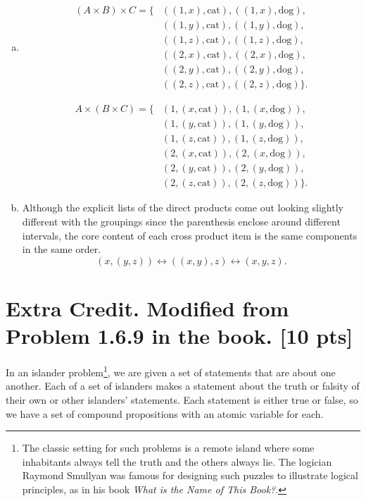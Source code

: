 \documentclass[12pt]{article}
\begin{document}
	\begin{enumerate}[(a)]
		\item
			\[
				\begin{aligned}
					(A \times B) \times C = \{ & ((1,x),\text{cat}), ((1,x),\text{dog}),    \\
					                           & ((1,y),\text{cat}), ((1,y),\text{dog}),    \\
					                           & ((1,z),\text{cat}), ((1,z),\text{dog}),    \\
					                           & ((2,x),\text{cat}), ((2,x),\text{dog}),    \\
					                           & ((2,y),\text{cat}), ((2,y),\text{dog}),    \\
					                           & ((2,z),\text{cat}), ((2,z),\text{dog}) \}.
				\end{aligned}
			\]

			\[
				\begin{aligned}
					A \times (B \times C) = \{ & (1,(x,\text{cat})), (1,(x,\text{dog})),    \\
					                           & (1,(y,\text{cat})), (1,(y,\text{dog})),    \\
					                           & (1,(z,\text{cat})), (1,(z,\text{dog})),    \\
					                           & (2,(x,\text{cat})), (2,(x,\text{dog})),    \\
					                           & (2,(y,\text{cat})), (2,(y,\text{dog})),    \\
					                           & (2,(z,\text{cat})), (2,(z,\text{dog})) \}.
				\end{aligned}
			\]

		\item Although the explicit lists of the direct products come out looking slightly
			different with the groupings since the parenthesis enclose around different
			intervals, the core content of each cross product item is the same
			components in the same order.
			\[
				(x,(y,z)) \leftrightarrow ((x,y),z) \leftrightarrow (x,y,z).
			\]
	\end{enumerate}

	\newpage

	\section*{\textbf{Extra Credit. Modified from Problem 1.6.9 in the book.} [10
	pts]}
	In an islander problem\footnote{The classic setting for such problems is a
	remote island where some inhabitants always tell the truth and the others
	always lie. The logician Raymond Smullyan was famous for designing such puzzles
	to illustrate logical principles, as in his book
	{\em What is the Name of This Book?}.}, we are given a set of statements that are
	about one another. Each of a set of islanders makes a statement about the
	truth or falsity of their own or other islanders’ statements. Each statement is
	either true or false, so we have a set of compound propositions with an atomic
	variable for each.
\end{document}
